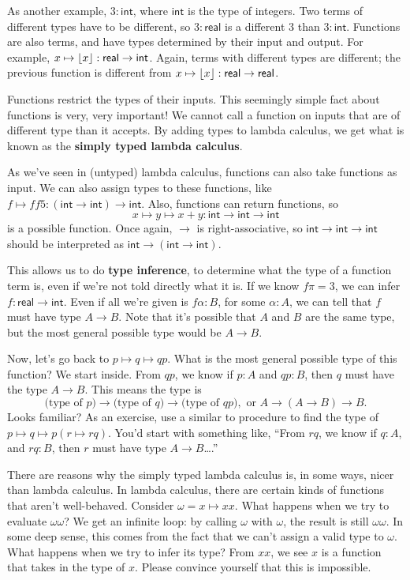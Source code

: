 \documentclass[11pt,paper=letter]{scrartcl}
\renewcommand{\sf}{\mathsf}
\begin{document}
As another example, $3 : \sf{int}$, where $\sf{int}$ is the type of integers. Two terms of different types have to be different, so $3 : \sf{real}$ is a different $3$ than $3 : \sf{int}$. Functions are also terms, and have types determined by their input and output. For example, $x \mapsto \floor{x} : \sf{real} \to \sf{int}$. Again, terms with different types are different; the previous function is different from $x \mapsto \floor{x} : \sf{real} \to \sf{real}$.

Functions restrict the types of their inputs. This seemingly simple fact about functions is very, very important! We cannot call a function on inputs that are of different type than it accepts. By adding types to lambda calculus, we get what is known as the \textbf{simply typed lambda calculus}.

As we've seen in (untyped) lambda calculus, functions can also take functions as input. We can also assign types to these functions, like $f \mapsto ff5 : (\sf{int} \to \sf{int}) \to \sf{int}$. Also, functions can return functions, so \[
x \mapsto y \mapsto x + y : \sf{int} \to \sf{int} \to \sf{int}
\] is a possible function. Once again, $\to$ is right-associative, so $\sf{int} \to \sf{int} \to \sf{int}$ should be interpreted as $\sf{int} \to (\sf{int} \to \sf{int})$.

This allows us to do \textbf{type inference}, to determine what the type of a function term is, even if we're not told directly what it is. If we know $f\pi = 3$, we can infer $f : \sf{real} \to \sf{int}$. Even if all we're given is $f\alpha : B$, for some $\alpha : A$, we can tell that $f$ must have type $A \to B$. Note that it's possible that $A$ and $B$ are the same type, but the most general possible type would be $A \to B$.

Now, let's go back to $p \mapsto q \mapsto qp$. What is the most general possible type of this function? We start inside. From $qp$, we know if $p : A$ and $qp : B$, then $q$ must have the type $A \to B$. This means the type is \[
  \text{(type of $p$)} \to \text{(type of $q$)} \to \text{(type of $qp$)}, \text{ or } A \to (A \to B) \to B.
\]
Looks familiar? As an exercise, use a similar to procedure to find the type of $p \mapsto q \mapsto p(r \mapsto rq)$. You'd start with something like, ``From $rq$, we know if $q : A$, and $rq : B$, then $r$ must have type $A \to B$\dots.''

There are reasons why the simply typed lambda calculus is, in some ways, nicer than lambda calculus. In lambda calculus, there are certain kinds of functions that aren't well-behaved. Consider $\omega = x \mapsto xx$. What happens when we try to evaluate $\omega\omega$? We get an infinite loop: by calling $\omega$ with $\omega$, the result is still $\omega\omega$. In some deep sense, this comes from the fact that we can't assign a valid type to $\omega$. What happens when we try to infer its type? From $xx$, we see $x$ is a function that takes in the type of $x$. Please convince yourself that this is impossible.
\end{document}
